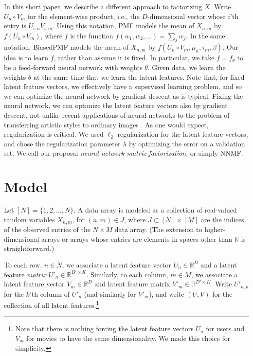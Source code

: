 \documentclass{article} \usepackage{iclr2016_conference,times}
\newcommand{\Reals}{\mathbb{R}}
\newcommand{\hprod}{\circ}
\begin{document}
In this short paper, we describe a different approach to factorizing $X$.  
Write $U_n \hprod V_m$ for the element-wise product, i.e., the $D$-dimensional vector whose $i$'th entry is $U_{i,n} V_{i,m}$. 
Using this notation, PMF models the mean of $X_{n,m}$ by $f(U_n \hprod V_m)$, where $f$ is the function $f(w_1,w_2,\dotsc) = \sum_j w_j$.  In the same notation, BiasedPMF models the mean of $X_{n,m}$ by $f(U_n \hprod V_m, \mu_n, \tau_m, \beta)$.
Our idea is to learn $f$, rather than assume it is fixed.  In particular, we take $f=f_\theta$ to be a feed-forward neural network with weights $\theta$.  Given data, we learn the weights $\theta$ at the same time that we learn the latent features.  Note that, for fixed latent feature vectors, we effectively have a supervised learning problem, and so we can optimize the neural network by gradient descent as is typical.  Fixing the neural network, we can optimize the latent feature vectors also by gradient descent, not unlike recent applications of neural networks to the problem of transferring artistic styles to ordinary images \citep{NeuralArt}.
  As one would expect, regularization is critical.  We used $\ell_2$-regularization for the latent feature vectors, and chose the regularization parameter $\lambda$ by optimizing the error on a validation set. We call our proposal \emph{neural network matrix factorization}, or simply NNMF.

\section{Model}
\label{model}

Let $[N] = \{1,2,\dotsc,N\}$.
A data array is modeled as a collection of real-valued random variables
$X_{n,m}$, for $(n,m) \in J$, where $J \subset [N] \times [M]$ are the indices of the observed entries of the $N \times M$ data array.
(The extension to higher-dimensional arrays or arrays whose entries are elements in spaces other than $\Reals$ is straightforward.)

\newcommand{\DV}{D}
\newcommand{\DM}{{D'}}
\newcommand{\uu}{U}
\newcommand{\UU}{U'}
\newcommand{\vv}{V}
\newcommand{\VV}{V'}

To each row, $n \in N$, 
we associate a 
latent feature vector $\uu_n \in \Reals^\DV$
and 
a latent feature \emph{matrix} $\UU_n \in \Reals^{\DM \times K}$.
Similarly, 
to each column, $m \in M$, we associate a 
latent feature vector $\vv_m \in \Reals^{\DV}$
and 
latent feature matrix $\VV_m \in \Reals^{\DM \times K}$.
Write $\UU_{n,k}$ for the $k$'th column of $\UU_n$ (and similarly for $\VV_m$), and write $(U,V)$ for the collection of all latent features.\footnote{Note that there is nothing forcing the latent feature vectors $\uu_n$ for users and $\vv_m$ for movies to have the same dimensionality.  We made this choice for simplicity.}
\end{document}
